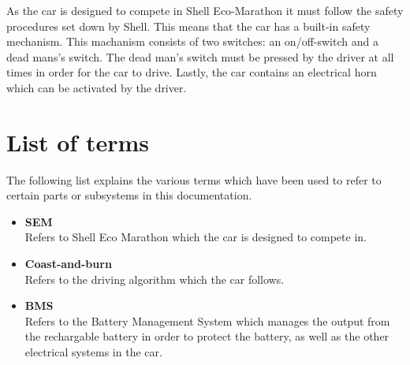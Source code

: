 As the car is designed to compete in Shell Eco-Marathon it must follow the safety procedures set down by Shell. This means that the car has a built-in safety mechanism. This machanism consists of two switches: an on/off-switch and a dead mans's switch. The dead man's switch must be pressed by the driver at all times in order for the car to drive.
Lastly, the car contains an electrical horn which can be activated by the driver.

\section{List of terms}
The following list explains the various terms which have been used to refer to certain parts or subsystems in this documentation.

\begin{itemize}
	\item \textbf{SEM}\\
	Refers to Shell Eco Marathon which the car is designed to compete in.
	\item \textbf{Coast-and-burn}\\
	Refers to the driving algorithm which the car follows.
	\item \textbf{BMS}\\
	Refers to the Battery Management System which manages the output from the rechargable battery in order to protect the battery, as well as the other electrical systems in the car.
\end{itemize}